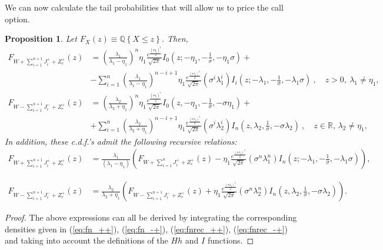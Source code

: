 \documentclass[11pt]{article}
\newtheorem{prop}[theorem]{Proposition}
\numberwithin{equation}{section}
\numberwithin{theorem}{section}
\def\Q{\mathbb{Q}}
\begin{document}
We can now calculate the tail probabilities that will allow us to
price the call option. 
\begin{prop}
Let $F_{X}(z)\equiv \Q\left\{ X\leq z\right\} $. Then,
\begin{align}
F_{W+\sum_{i=1}^{n+1}J_{i}^{+}+Z_{e}^{+}}(z) & =  \left(\frac{\lambda_{1}}{\lambda_{1}-\eta_{1}}\right)^{n}\eta_{1}\frac{e^{\frac{\left(\sigma\eta_{1}\right)^{2}}{2}}}{\sqrt{2\pi}}I_{0}\left(z;-\eta_{1},-\frac{1}{\sigma},-\eta_{1}\sigma\right)+\label{eq:fn_++-1}\\
 &   -\sum_{i=1}^{n}\left(\frac{\lambda_{1}}{\lambda_{1}-\eta_{1}}\right)^{n-i+1}\eta_{1}\frac{e^{\frac{\left(\sigma\lambda_{1}\right)^{2}}{2}}}{\sqrt{2\pi}}\left(\sigma^{i}\lambda_{1}^{i}\right)I_{i}\left(z;-\lambda_{1},-\frac{1}{\sigma},-\lambda_{1}\sigma\right)\ ,\quad z>0,\ \lambda_{1}\neq\eta_{1},\nonumber 
\end{align}
\begin{align}
F_{W-\sum_{i=1}^{n+1}J_{i}^{-}+Z_{e}^{+}} (z)& =  \left(\frac{\lambda_{2}}{\lambda_{2}+\eta_{1}}\right)^{n}\eta_{1}\frac{e^{\frac{\left(\sigma\eta_{1}\right)^{2}}{2}}}{\sqrt{2\pi}}I{}_{0}\left(z,-\eta_{1},-\frac{1}{\sigma},-\sigma\eta_{1}\right)+\label{eq:fn_-+-1}\\
 & +\sum_{i=1}^{n}\left(\frac{\lambda_{2}}{\lambda_{2}+\eta_{1}}\right)^{n-i+1}\eta_{1}\frac{e^{\frac{\left(\sigma\lambda_{2}\right)^{2}}{2}}}{\sqrt{2\pi}}\left(\sigma^{i}\lambda_{2}^{i}\right)I_{n} \left(z,\lambda_{2},\frac{1}{\sigma},-\sigma\lambda_{2}\right)\ ,\quad z\in \mathbb{R},\, \lambda_{2}\neq\eta_{1},\nonumber 
\end{align}
 In addition, these c.d.f.'s admit the following recursive
relations: 
\begin{align}
F_{W+\sum_{i=1}^{n+1}J_{i}^{+}+Z_{e}^{+}} (z)& =\frac{\lambda_{1}}{\left(\lambda_{1}-\eta_{1}\right)}\left(F_{W+\sum_{i=1}^{n}J_{i}^{+}+Z_{e}^{+}}(z)-\eta_{1}\frac{e^{\frac{\left(\sigma\lambda_{1}\right)^{2}}{2}}}{\sqrt{2\pi}}\left(\sigma^{n}\lambda_{1}^{n}\right)I_{n}\left(z;-\lambda_{1},-\frac{1}{\sigma},-\lambda_{1}\sigma\right)\right),\label{eq:fnrec_++-1}
\end{align}
 
\begin{align}
F_{W-\sum_{i=1}^{n+1}J_{i}^{-}+Z_{e}^{+}}(z) & =\frac{\lambda_{2}}{\lambda_{2}+\eta_{1}}\left(F_{W-\sum_{i=1}^{n+1}J_{i}^{-}+Z_{e}^{+}}(z)+\eta_{1}\frac{e^{\frac{\left(\sigma\lambda_{2}\right)^{2}}{2}}}{\sqrt{2\pi}}\left(\sigma^{n}\lambda_{2}^{n}\right)I{}_{n}\left(z,\lambda_{2},\frac{1}{\sigma},-\sigma\lambda_{2}\right)\right).\label{eq:fnrec_-+-1}
\end{align}
\end{prop}
\begin{proof}
The above expressions can all be derived by integrating the corresponding
densities given in (\ref{eq:fn_++}), (\ref{eq:fn_-+}), (\ref{eq:fnrec_++}), (\ref{eq:fnrec_-+}) and taking into
account the definitions of the $Hh$ and $I$ functions. 
\end{proof}
\end{document}
